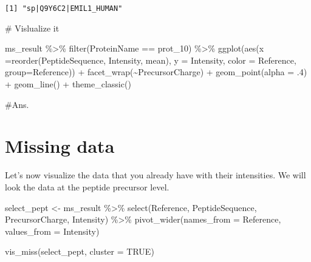 \documentclass[
  letterpaper,
  DIV=11,
  numbers=noendperiod]{scrartcl}
\newenvironment{Shaded}{\begin{snugshade}}{\end{snugshade}}
\newcommand{\AttributeTok}[1]{\textcolor[rgb]{0.40,0.45,0.13}{#1}}
\newcommand{\CommentTok}[1]{\textcolor[rgb]{0.37,0.37,0.37}{#1}}
\newcommand{\ConstantTok}[1]{\textcolor[rgb]{0.56,0.35,0.01}{#1}}
\newcommand{\DecValTok}[1]{\textcolor[rgb]{0.68,0.00,0.00}{#1}}
\newcommand{\FunctionTok}[1]{\textcolor[rgb]{0.28,0.35,0.67}{#1}}
\newcommand{\NormalTok}[1]{\textcolor[rgb]{0.00,0.23,0.31}{#1}}
\newcommand{\OtherTok}[1]{\textcolor[rgb]{0.00,0.23,0.31}{#1}}
\newcommand{\SpecialCharTok}[1]{\textcolor[rgb]{0.37,0.37,0.37}{#1}}
\begin{document}
\begin{verbatim}
[1] "sp|Q9Y6C2|EMIL1_HUMAN"
\end{verbatim}

\begin{Shaded}
\begin{Highlighting}[]
\CommentTok{\# Vislualize it }

\NormalTok{ms\_result }\SpecialCharTok{\%\textgreater{}\%} 
  \FunctionTok{filter}\NormalTok{(ProteinName }\SpecialCharTok{==}\NormalTok{ prot\_10) }\SpecialCharTok{\%\textgreater{}\%}  
  \FunctionTok{ggplot}\NormalTok{(}\FunctionTok{aes}\NormalTok{(}\AttributeTok{x =}\FunctionTok{reorder}\NormalTok{(PeptideSequence, Intensity, mean), }\AttributeTok{y =}\NormalTok{ Intensity, }\AttributeTok{color =}\NormalTok{ Reference, }\AttributeTok{group=}\NormalTok{Reference)) }\SpecialCharTok{+}
  \FunctionTok{facet\_wrap}\NormalTok{(}\SpecialCharTok{\textasciitilde{}}\NormalTok{PrecursorCharge) }\SpecialCharTok{+}
  \FunctionTok{geom\_point}\NormalTok{(}\AttributeTok{alpha =}\NormalTok{ .}\DecValTok{4}\NormalTok{) }\SpecialCharTok{+} \FunctionTok{geom\_line}\NormalTok{() }\SpecialCharTok{+}
  \FunctionTok{theme\_classic}\NormalTok{() }
\end{Highlighting}
\end{Shaded}


\#Ans.

\section{Missing data}\label{missing-data}

Let's now visualize the data that you already have with their
intensities. We will look the data at the peptide precursor level.

\begin{Shaded}
\begin{Highlighting}[]
\NormalTok{select\_pept }\OtherTok{\textless{}{-}}\NormalTok{ ms\_result }\SpecialCharTok{\%\textgreater{}\%} 
  \FunctionTok{select}\NormalTok{(Reference, PeptideSequence, PrecursorCharge, Intensity) }\SpecialCharTok{\%\textgreater{}\%} 
  \FunctionTok{pivot\_wider}\NormalTok{(}\AttributeTok{names\_from =}\NormalTok{ Reference, }\AttributeTok{values\_from =}\NormalTok{ Intensity) }


\FunctionTok{vis\_miss}\NormalTok{(select\_pept, }\AttributeTok{cluster =} \ConstantTok{TRUE}\NormalTok{)}
\end{Highlighting}
\end{Shaded}
\end{document}
